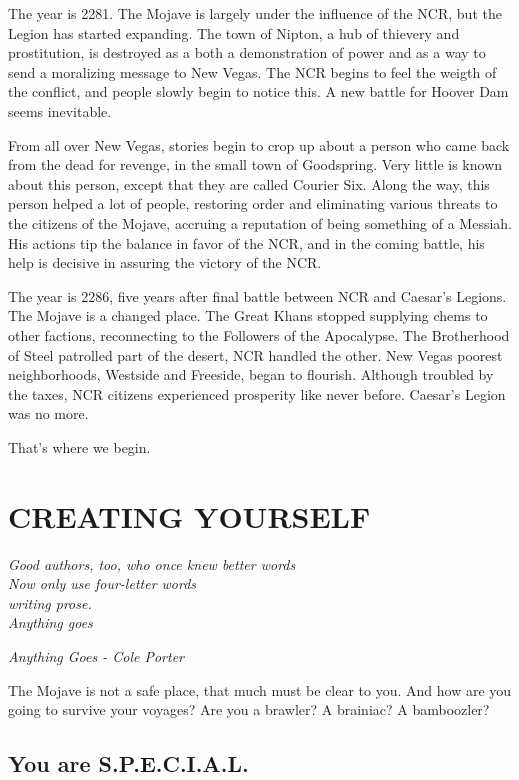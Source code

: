 \documentclass[11pt]{article} %
\begin{document}
The year is 2281. The Mojave is largely under the influence of the NCR, but the Legion has started expanding. The town of Nipton, a hub of thievery and prostitution, is destroyed as a both a demonstration of power and as a way to send a moralizing message to New Vegas. The NCR begins to feel the weigth of the conflict, and people slowly begin to notice this. A new battle for Hoover Dam seems inevitable. 

From all over New Vegas, stories begin to crop up about a person who came back from the dead for revenge, in the small town of Goodspring. Very little is known about this person, except that they are called Courier Six. Along the way, this person helped a lot of people, restoring order and eliminating various threats to the citizens of the Mojave, accruing a reputation of being something of a Messiah. His actions tip the balance in favor of the NCR, and in the coming battle, his help is decisive in assuring the victory of the NCR.

The year is 2286, five years after final battle between NCR and Caesar's Legions. The Mojave is a changed place. The Great Khans stopped supplying chems to other factions, reconnecting to the Followers of the Apocalypse. The Brotherhood of Steel patrolled part of the desert, NCR handled the other. New Vegas poorest neighborhoods, Westside and Freeside, began to flourish. Although troubled by the taxes, NCR citizens experienced prosperity like never before. Caesar's Legion was no more.

That's where we begin.

\newpage

\section{CREATING YOURSELF}

\epigraph{\textit{Good authors, too, who once knew better words \\
Now only use four-letter words \\
writing prose. \\
Anything goes}}{\textit{Anything Goes - Cole Porter}}

The Mojave is not a safe place, that much must be clear to you. And how are you going to survive your voyages? Are you a brawler? A brainiac? A bamboozler? 

\subsection{You are S.P.E.C.I.A.L.}
\end{document}
